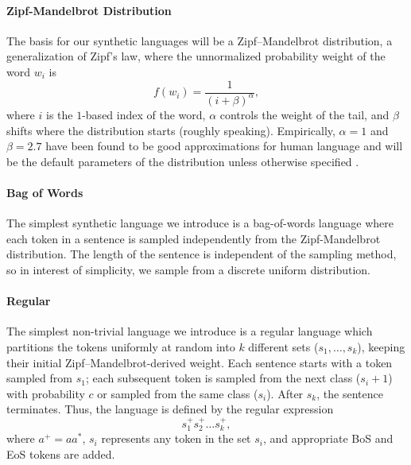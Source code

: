 \paragraph{Zipf-Mandelbrot Distribution}
The basis for our synthetic languages will be a Zipf--Mandelbrot distribution, a generalization of Zipf's law, where the unnormalized probability weight of the word $w_i$ is
\begin{equation}
  f(w_i) = \frac1{(i+\beta)^\alpha}
  ,
\end{equation}
where
  $i$ is the $1$-based index of the word,
  $\alpha$ controls the weight of the tail,
  and $\beta$ shifts where the distribution starts (roughly speaking).
Empirically, $\alpha=1$ and $\beta=2.7$ have been found to be good approximations for human language and will be the default parameters of the distribution unless otherwise specified \citep{piantadosi2014zipf}.



\paragraph{Bag of Words}
The simplest synthetic language we introduce is a bag-of-words language where each token in a sentence is sampled independently from the Zipf-Mandelbrot distribution.
The length of the sentence is independent of the sampling method, so in interest of simplicity, we sample from a discrete uniform distribution.



\paragraph{Regular}
The simplest non-trivial language we introduce is a regular language which partitions the tokens uniformly at random into $k$ different sets ($s_1,\dots,s_k$), keeping their initial Zipf--Mandelbrot-derived weight.
Each sentence starts with a token sampled from $s_1$; each subsequent token is sampled from the next class ($s_i+1$) with probability $c$ or sampled from the same class ($s_i$).
After $s_k$, the sentence terminates.
Thus, the language is defined by the regular expression
\begin{equation}
  s_1^+
  s_2^+
  \dots
  s_k^+
  ,
\end{equation}
where
  $a^+=aa^*$,
  $s_i$ represents any token in the set $s_i$,
  and appropriate BoS and EoS tokens are added.


